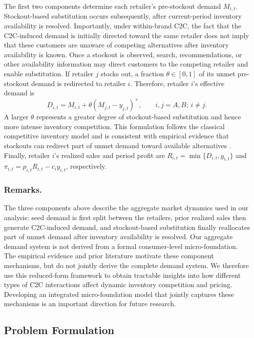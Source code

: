 \documentclass[nonblindrev,copyedit]{informs1}
\begin{document}
The first two components determine each retailer's pre-stockout demand $M_{i,t}$. Stockout-based substitution occurs subsequently, after current-period inventory availability is resolved. Importantly, under within-brand C2C, the fact that the C2C-induced demand is initially directed toward the same retailer does not imply that these customers are unaware of competing alternatives after inventory availability is known. Once a stockout is observed, search, recommendations, or other availability information may direct customers to the competing retailer and enable substitution. If retailer $j$ stocks out, a fraction $\theta\in[0,1]$ of its unmet pre-stockout demand is redirected to retailer $i$. Therefore, retailer $i$'s effective demand is
\[
D_{i,t}=M_{i,t}+\theta\left(M_{j,t}-y_{j,t}\right)^+, \qquad i,j=A,B;\ i\neq j.
\]
A larger $\theta$ represents a greater degree of stockout-based substitution and hence more intense inventory competition. This formulation follows the classical competitive inventory model and is consistent with empirical evidence that stockouts can redirect part of unmet demand toward available alternatives \citep[see, e.g.,][]{lee2016,li2023,ergin2022}.
Finally, retailer $i$'s realized sales and period profit are $R_{i,t}=\min\{D_{i,t},y_{i,t}\}$ and $\pi_{i,t}=p_{i,t}R_{i,t}-c_i y_{i,t}$, respectively.

\subsubsection{Remarks.}

The three components above describe the aggregate market dynamics used in our analysis: seed demand is first split between the retailers, prior realized sales then generate C2C-induced demand, and stockout-based substitution finally reallocates part of unmet demand after inventory availability is resolved. Our aggregate demand system is not derived from a formal consumer-level micro-foundation. The empirical evidence and prior literature motivate these component mechanisms, but do not jointly derive the complete demand system. We therefore use this reduced-form framework to obtain tractable insights into how different types of C2C interactions affect dynamic inventory competition and pricing. Developing an integrated micro-foundation model that jointly captures these mechanisms is an important direction for future research.

\subsection{Problem Formulation}\label{sec:form}
\end{document}
